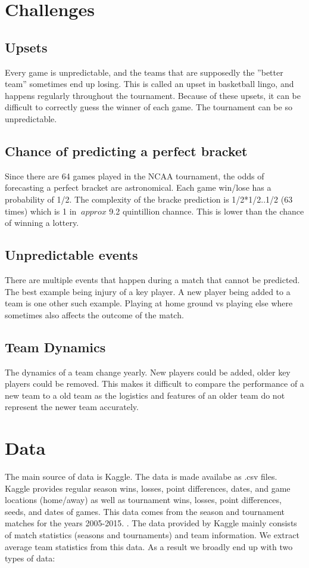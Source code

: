\documentclass{article}
\begin{document}
    	\begin{multicols}{2}  
	\section{Challenges}
	\subsection{Upsets}
	Every game is unpredictable, and the teams that are supposedly the ”better team” sometimes end up losing. This
is called an upset in basketball lingo, and happens regularly throughout the tournament. Because of these upsets, it can be difficult to correctly guess the winner of each game. The tournament can be so unpredictable.\cite{2}

	\subsection{Chance of predicting a perfect bracket}
	Since there are 64 games played in the NCAA tournament,
the odds of forecasting a perfect bracket are astronomical. Each game win/lose has a probability of 1/2. The complexity of the bracke prediction is 1/2*1/2..1/2 (63 times) which is 1 in $~approx$ 9.2 quintillion channce. This is lower than the chance of winning a lottery.

	\subsection{Unpredictable events}
	There are multiple events that happen during a match that cannot be predicted. The best example being injury of a key player. A new player being added to a team is one other such example. Playing at home ground vs playing else where sometimes also affects the outcome of the match.
	
	\subsection{Team Dynamics}
	The dynamics of a team change yearly. New players could be added, older key players could be removed. This makes it difficult to compare the performance of a new team to a old team as the logistics and features of an older team do not represent the newer team accurately. 
	
	\section{Data}
	The main source of data is Kaggle. The data is made availabe as .csv files. Kaggle provides regular season wins, losses, point differences, dates, and game locations (home/away) as well as tournament wins, losses, point differences, seeds, and dates of games. This data comes from the season and tournament matches for the years 2005-2015. \cite{1}. 
	\linebreak 
	The data provided by Kaggle mainly consists of match statistics (seasons and tournaments) and team information. We extract average team statistics from this data. As a result we broadly end up with two types of data: \cite{1}


\end{multicols}
\end{document}
